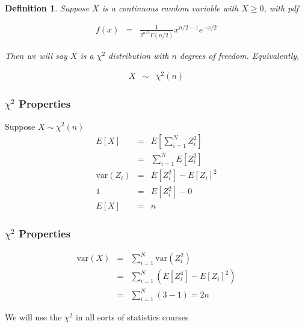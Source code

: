 \documentclass[handout]{beamer}
\newtheorem{defn}{Definition}
\numberwithin{equation}{section}
\begin{document}
\begin{frame}

\begin{defn}
Suppose $X$ is a continuous random variable with $X\geq 0$, with pdf 

\begin{eqnarray}
f(x) & = & \frac{1}{2^{n/2} \Gamma(n/2) } x^{n/2 - 1} e^{-x/2} \nonumber 
\end{eqnarray}

Then we will say $X$ is a $\chi^2$ distribution with $n$ degrees of freedom.  Equivalently,

\begin{eqnarray}
X & \sim & \chi^{2}(n) \nonumber 
\end{eqnarray}

\end{defn}



\end{frame}


\begin{frame}
\frametitle{$\chi^2$ Properties}

Suppose $X \sim \chi^2(n)$
\begin{eqnarray}
E[X] & = & E\left[\sum_{i=1}^{N} Z_{i}^2\right] \nonumber \\
 & = & \sum_{i=1}^{N} E[Z_{i}^{2} ] \nonumber \\
\text{var}(Z_{i} ) & = & E[Z_{i}^2] - E[Z_{i}]^2 \nonumber\\
1 & = & E[Z_{i}^2]- 0 \nonumber \\
E[X] & = & n \nonumber 
 \end{eqnarray}



\end{frame}

\begin{frame}
\frametitle{$\chi^2$ Properties}

\begin{eqnarray}
\text{var}(X) & = & \sum_{i=1}^{N} \text{var}(Z_{i}^2) \nonumber \\
& = & \sum_{i=1}^{N} \left(E[Z_{i}^{4} ] - E[Z_{i}]^{2}  \right) \nonumber \\
& = & \sum_{i=1}^{N} \left(3 - 1\right ) = 2n \nonumber 
\end{eqnarray}

We will use the $\chi^2$ in all sorts of statistics courses  


\end{frame}
\end{document}
